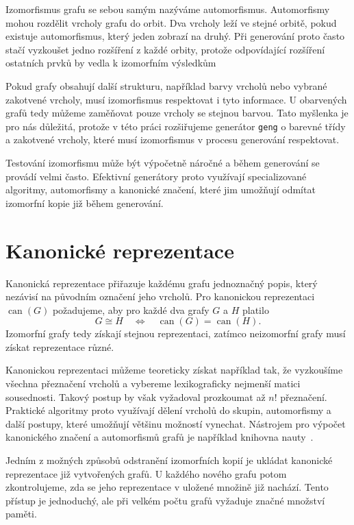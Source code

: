 Izomorfismus grafu se sebou samým nazýváme automorfismus. Automorfismy mohou
rozdělit vrcholy grafu do orbit. Dva vrcholy leží ve stejné orbitě,
pokud existuje automorfismus, který jeden zobrazí na druhý. Při generování
proto často stačí vyzkoušet jedno rozšíření z každé orbity, protože odpovídající
rozšíření ostatních prvků by vedla k izomorfním výsledkům
~\cite[Section~2.2]{jooken2025computerassisted}

Pokud grafy obsahují další strukturu, například barvy vrcholů nebo vybrané zakotvené
vrcholy, musí izomorfismus respektovat i tyto informace. U obarvených grafů tedy můžeme
zaměňovat pouze vrcholy se stejnou barvou. Tato myšlenka je pro nás důležitá, protože v této práci rozšiřujeme generátor
\texttt{geng} o barevné třídy a zakotvené vrcholy, které musí izomorfismus
v procesu generování respektovat.

Testování izomorfismu může být výpočetně náročné a během generování se provádí
velmi často. Efektivní generátory proto využívají specializované algoritmy,
automorfismy a kanonické značení, které jim umožňují odmítat izomorfní kopie
již během generování.

\section{Kanonické reprezentace}
\label{sec:canonical-representations}



Kanonická reprezentace přiřazuje každému grafu jednoznačný popis, který
nezávisí na původním označení jeho vrcholů. Pro kanonickou reprezentaci
\(\operatorname{can}(G)\) požadujeme, aby pro každé dva grafy \(G\) a \(H\)
platilo
\[
    G \cong H
    \quad\Longleftrightarrow\quad
    \operatorname{can}(G)=\operatorname{can}(H).
\]
Izomorfní grafy tedy získají stejnou reprezentaci, zatímco neizomorfní grafy
musí získat reprezentace různé.


Kanonickou reprezentaci můžeme teoreticky získat například tak, že vyzkoušíme
všechna přeznačení vrcholů a vybereme lexikograficky nejmenší matici
sousednosti. Takový postup by však vyžadoval prozkoumat až \(n!\) přeznačení.
Praktické algoritmy proto využívají dělení vrcholů do skupin, automorfismy
a další postupy, které umožňují většinu možností vynechat. Nástrojem pro
výpočet kanonického značení a automorfismů grafů je například knihovna
nauty~\cite{mckay2014practical}.

Jedním z možných způsobů odstranění izomorfních kopií je ukládat kanonické
reprezentace již vytvořených grafů. U každého nového grafu potom zkontrolujeme,
zda se jeho reprezentace v uložené množině již nachází. Tento přístup je
jednoduchý, ale při velkém počtu grafů vyžaduje značné množství paměti.


